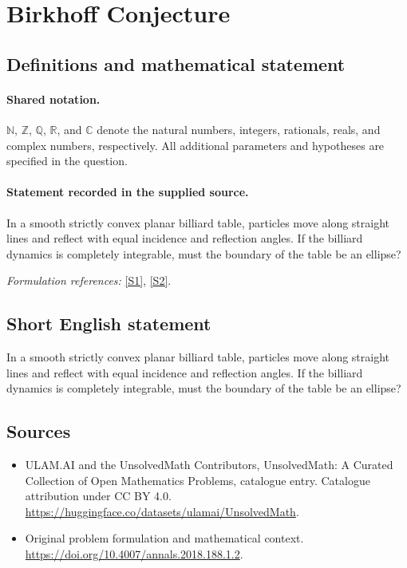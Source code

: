 \documentclass[11pt]{article}
\newcommand{\sref}[2]{\hyperlink{source:#1:#2}{[S#2]}}
\begin{document}
\section{Birkhoff Conjecture}\label{statement}

\subsection{Definitions and mathematical statement}

\paragraph{Shared notation.}$\mathbb N$, $\mathbb Z$, $\mathbb Q$, $\mathbb R$, and $\mathbb C$ denote the natural numbers, integers, rationals, reals, and complex numbers, respectively. All additional parameters and hypotheses are specified in the question.


\paragraph{Statement recorded in the supplied source.}
In a smooth strictly convex planar billiard table, particles move along straight lines and reflect with equal incidence and reflection angles. If the billiard dynamics is completely integrable, must the boundary of the table be an ellipse?
\par\smallskip\textit{Formulation references:} \sref{statement}{1}, \sref{statement}{2}.
\subsection{Short English statement}
In a smooth strictly convex planar billiard table, particles move along straight lines and reflect with equal incidence and reflection angles. If the billiard dynamics is completely integrable, must the boundary of the table be an ellipse?
\subsection{Sources}
\begin{itemize}
\item[\hypertarget{source:statement:1}{S1}] ULAM.AI and the UnsolvedMath Contributors, UnsolvedMath: A Curated Collection of Open Mathematics Problems, catalogue entry. Catalogue attribution under CC BY 4.0.
\url{https://huggingface.co/datasets/ulamai/UnsolvedMath}.
\item[\hypertarget{source:statement:2}{S2}] Original problem formulation and mathematical context.
\url{https://doi.org/10.4007/annals.2018.188.1.2}.
\end{itemize}
\label{end:statement}
\end{document}
